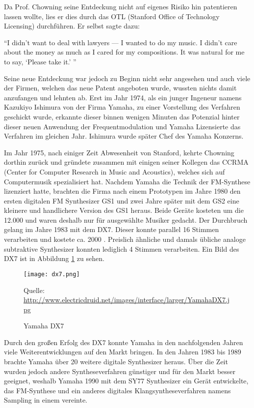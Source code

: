 Da Prof. Chowning seine Entdeckung nicht auf eigenes Risiko hin patentieren lassen wollte, lies er dies durch das OTL (Stanford Office of Technology Licensing) durchführen. Er selbst sagte dazu:

``I didn’t want to deal with lawyers — I wanted to do my music. I didn’t care about the money as much as I cared for my compositions. It was natural for me to say, `Please take it.' ''

 Seine neue Entdeckung war jedoch zu Beginn nicht sehr angesehen und auch viele der Firmen, welchen das neue Patent angeboten wurde, wussten nichts damit anzufangen und lehnten ab. Erst im Jahr 1974, als ein junger Ingeneur namens Kazukiyo Ishimura von der Firma Yamaha, zu einer Vorstellung des Verfahren geschickt wurde, erkannte dieser binnen wenigen Minuten das Potenzial hinter dieser neuen Anwendung der Frequentmodulation und Yamaha Lizensierte das Verfahren im gleichen Jahr. Ishimura wurde später Chef des Yamaha Konzerns. 

Im Jahr 1975, nach einiger Zeit Abwesenheit von Stanford, kehrte Chowning dorthin zurück und gründete zusammen mit einigen seiner Kollegen das CCRMA (Center for Computer Research in Music and Acoustics), welches sich auf Computermusik spezialisiert hat.
Nachdem Yamaha die Technik der FM-Synthese lizenziert hatte, brachten die Firma nach einem Prototypen im Jahre 1980 den ersten digitalen FM Synthesizer GS1 und zwei Jahre später mit dem GS2 eine kleinere und handlichere Version des GS1 heraus. Beide Geräte kosteten um die 12.000 \textdollar und waren deshalb nur für ausgewählte Musiker gedacht. Der Durchbruch gelang im Jahre 1983 mit dem DX7. Dieser konnte parallel 16 Stimmen verarbeiten und kostete ca. 2000 \textdollar. Preislich ähnliche und damals übliche analoge subtraktive Synthesizer konnten lediglich 4 Stimmen verarbeiten. Ein Bild des DX7 ist in Abbildung \ref{fig:dx7} zu sehen.

 \begin{figure} [ht]
\centering
  \texttt{[image: dx7.png]}
\caption{Yamaha DX7}
\label{fig:dx7}
Quelle: \url{http://www.electricdruid.net/images/interface/larger/YamahaDX7.jpg}
\end{figure}

Durch den großen Erfolg des DX7 konnte Yamaha in den nachfolgenden Jahren viele Weiterentwicklungen auf den Markt bringen. In den Jahren 1983 bis 1989 brachte Yamaha über 20 weitere digitale Synthesizer heraus. Über die Zeit wurden jedoch andere Syntheseverfahren günstiger und für den Markt besser geeignet, weshalb Yamaha 1990 mit dem SY77 Synthesizer ein Gerät entwickelte, das FM-Synthese und ein anderes digitales Klangsyntheseverfahren namens Sampling in einem vereinte. 

